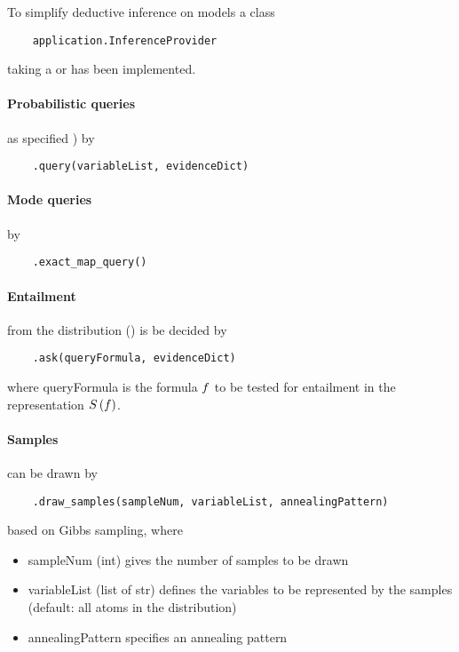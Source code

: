 
To simplify deductive inference on models a class
\begin{lstlisting}
	application.InferenceProvider
\end{lstlisting}
taking a  or  has been implemented.


\paragraph{Probabilistic queries} as specified )  by
\begin{lstlisting}
	.query(variableList, evidenceDict)
\end{lstlisting}

\paragraph{Mode queries} by
\begin{lstlisting}
	.exact_map_query()
\end{lstlisting}


\paragraph{Entailment} from the distribution () is be decided by
\begin{lstlisting}
	.ask(queryFormula, evidenceDict)
\end{lstlisting}
where queryFormula is the formula $f$ to be tested for entailment in the representation $S\left(f\right)$.


\paragraph{Samples} can be drawn by
\begin{lstlisting}
	.draw_samples(sampleNum, variableList, annealingPattern)
\end{lstlisting}
based on Gibbs sampling, where
\begin{itemize}
    \item sampleNum (int) gives the number of samples to be drawn
    \item variableList (list of str) defines the variables to be represented by the samples (default: all atoms in the distribution)
    \item annealingPattern specifies an annealing pattern
\end{itemize}


